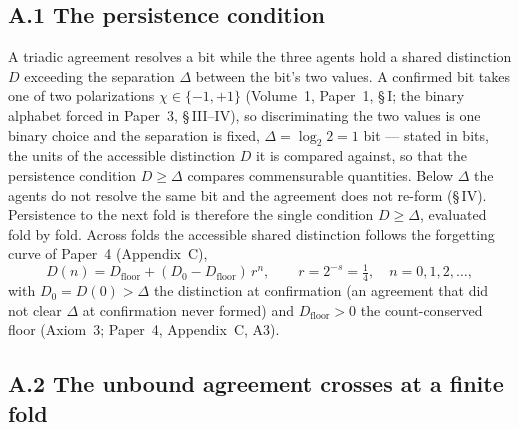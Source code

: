 \documentclass[11pt,oneside]{report}
\theoremstyle{definition}
\theoremstyle{remark}
\begin{document}
\subsection*{A.1 The persistence condition}

A triadic agreement resolves a bit while the three agents hold a shared distinction
\ensuremath{D} exceeding the separation \ensuremath{\Delta} between the bit's two
values. A confirmed bit takes one of two polarizations \ensuremath{\chi \in \{-1,+1\}}
(Volume~1, Paper~1, \S\,I; the binary alphabet forced in Paper~3, \S\,III--IV), so
discriminating the two values is one binary choice and the separation is fixed,
\ensuremath{\Delta = \log_2 2 = 1} bit --- stated in bits, the units of the accessible
distinction \ensuremath{D} it is compared against, so that the persistence condition
\ensuremath{D \geq \Delta} compares commensurable quantities.
Below \ensuremath{\Delta} the agents do not resolve the same bit and the agreement does
not re-form (\S\,IV). Persistence to the next fold is therefore the
single condition \ensuremath{D \geq \Delta}, evaluated fold by fold. Across folds the
accessible shared distinction follows the forgetting curve of Paper~4 (Appendix~C),
\begin{equation}
D(n) = D_{\mathrm{floor}} + (D_0 - D_{\mathrm{floor}})\,r^{n},
\qquad r = 2^{-s} = \tfrac{1}{4},\quad n = 0,1,2,\dots,
\label{eq:A-decay}
\end{equation}
with \ensuremath{D_0 = D(0) > \Delta} the distinction at confirmation (an agreement
that did not clear \ensuremath{\Delta} at confirmation never formed) and
\ensuremath{D_{\mathrm{floor}} > 0} the count-conserved floor (Axiom~3; Paper~4,
Appendix~C, A3).

\subsection*{A.2 The unbound agreement crosses at a finite fold}
\end{document}
